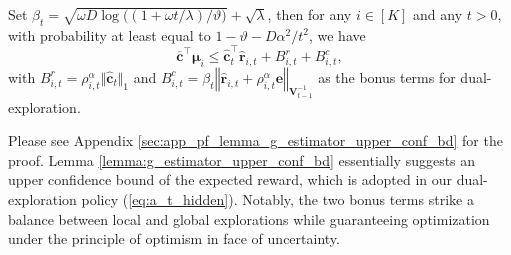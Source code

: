\begin{lemma}
\label{lemma:g_estimator_upper_conf_bd}
Set $\beta_t = \sqrt{\omega D \log\big((1 + \omega t/\lambda)/\vartheta\big)} + \sqrt{\lambda}$, then for any $i \in [K]$ and any $t > 0$, with probability at least equal to $1 - \vartheta - D\alpha^2/t^2$, we have
\begin{equation}
\label{eq:ucb_hidden}
\boldsymbol{\overline{c}}^{\top} \boldsymbol{\mu}_{i} 
\leq
\boldsymbol{\hat{c}}_{t}^{\top} \boldsymbol{\hat{r}}_{i,t} 
+
B_{i,t}^{r}
+
B_{i,t}^{c},
\end{equation}
with 
$B_{i,t}^{r} = \rho_{i,t}^{\alpha} \Vert \hat{\boldsymbol{c}}_t \Vert_1$
and 
$B_{i,t}^{c} = \beta_t \left \Vert \hat{\boldsymbol{r}}_{i,t} \!+\! \rho_{i,t}^{\alpha} \boldsymbol{e} \right \Vert_{\boldsymbol{V}_{t-1}^{-1}}$
as the bonus terms for dual-exploration.
\end{lemma}

Please see Appendix \ref{sec:app_pf_lemma_g_estimator_upper_conf_bd} for the proof. Lemma \ref{lemma:g_estimator_upper_conf_bd} essentially suggests an upper confidence bound of the expected reward, which is adopted in our dual-exploration policy (\ref{eq:a_t_hidden}).
Notably, the two bonus terms strike a balance between local and global explorations while guaranteeing optimization under the principle of optimism in face of uncertainty.




